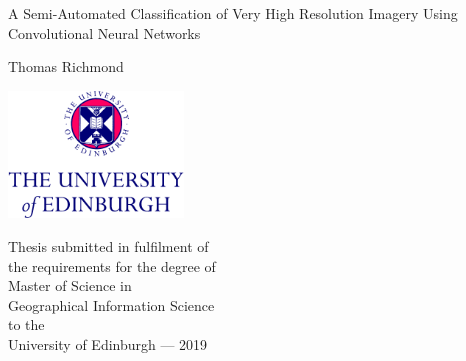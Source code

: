 

\thispagestyle{empty}

\begin{minipage}{\textwidth}
\end{minipage}
\begin{center}
\vspace{2cm}
{ \Huge A Semi-Automated Classification of Very High Resolution Imagery Using Convolutional Neural Networks
  \par
  \vspace{0.5cm} 
{\Large Thomas Richmond \par}
}
\end{center}
\vfill
\begin{center}
\vspace{6cm}    
\centerline{\includegraphics[width=0.35\textwidth]{../preface/2Line2ColCMYK_CS3.pdf}}
\vspace{0.5cm}
Thesis submitted in fulfilment of\\
the requirements for the degree of\\ 
Master of Science in\\
Geographical Information Science\\
to the\\
University of Edinburgh --- 2019
\end{center}

\newpage
\thispagestyle{empty}



